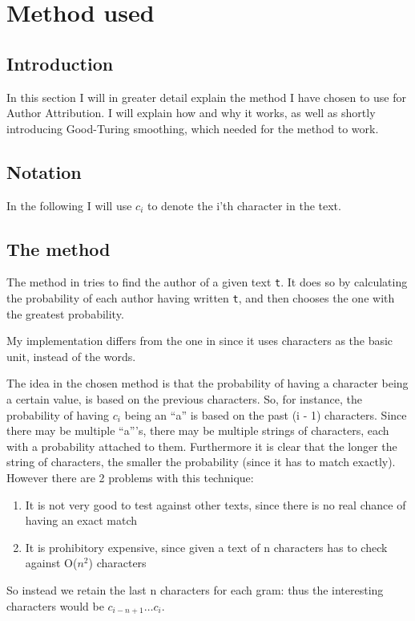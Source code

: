 \section{Method used}
\label{method}

\subsection{Introduction}
In this section I will in greater detail explain the method I have chosen to use for Author Attribution. I will explain how and why it works, as well as shortly introducing Good-Turing smoothing, which needed for the method to work.

\subsection*{Notation}
In the following I will use $c_i$ to denote the i'th character in the text.

\subsection{The method}
The method in \cite{nr4} tries to find the author of a given text \texttt{t}. It does so by calculating the probability of each author having written \texttt{t}, and then chooses the one with the greatest probability.

My implementation differs from the one in \cite{nr4} since it uses characters as the basic unit, instead of the words. 

The idea in the chosen method is that the probability of having a character being a certain value, is based on the previous characters. So, for instance, the probability of having $c_i$ being an ``a'' is based on the past (i - 1) characters. Since there may be multiple ``a'''s, there may be multiple strings of characters, each with a probability attached to them. Furthermore it is clear that the longer the string of characters, the smaller the probability (since it has to match exactly). However there are 2 problems with this technique:
\begin{enumerate}
\item It is not very good to test against other texts, since there is no real chance of having an exact match
\item It is prohibitory expensive, since given a text of n characters has to check against O($n^2$) characters  
\end{enumerate}
So instead we retain the last n characters for each gram: thus the interesting characters would be $c_{i - n + 1} \ldots c_{i}$.\\

